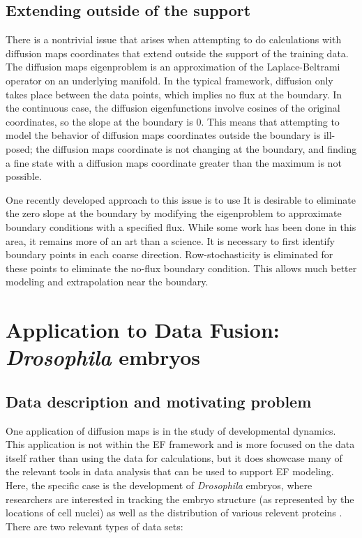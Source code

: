 \documentclass[12pt]{article}
\begin{document}
\subsection{Extending outside of the support}
There is a nontrivial issue that arises when attempting to do calculations with diffusion maps coordinates that extend outside the support of the training data. The diffusion maps eigenproblem is an approximation of the Laplace-Beltrami operator on an underlying manifold. In the typical framework, diffusion only takes place between the data points, which implies no flux at the boundary. In the continuous case, the diffusion eigenfunctions involve cosines of the original coordinates, so the slope at the boundary is 0. This means that attempting to model the behavior of diffusion maps coordinates outside the boundary is ill-posed; the diffusion maps coordinate is not changing at the boundary, and finding a fine state with a diffusion maps coordinate greater than the maximum is not possible.\vspace{1mm}

One recently developed approach to this issue is to use It is desirable to eliminate the zero slope at the boundary by modifying the eigenproblem to approximate boundary conditions with a specified flux. While some work has been done in this area, it remains more of an art than a science. It is necessary to first identify boundary points in each coarse direction. Row-stochasticity is eliminated for these points to eliminate the no-flux boundary condition. This allows much better modeling and extrapolation near the boundary.

\section{Application to Data Fusion: \textit{Drosophila} embryos}

\subsection{Data description and motivating problem}

One application of diffusion maps is in the study of developmental dynamics. This application is not within the EF framework and is more focused on the data itself rather than using the data for calculations, but it does showcase many of the relevant tools in data analysis that can be used to support EF modeling. Here, the specific case is the development of \textit{Drosophila} embryos, where researchers are interested in tracking the embryo structure (as represented by the locations of cell nuclei) as well as the distribution of various relevent proteins \cite{Lim2015} \cite{Dsilva2015a}. There are two relevant types of data sets:
\end{document}
